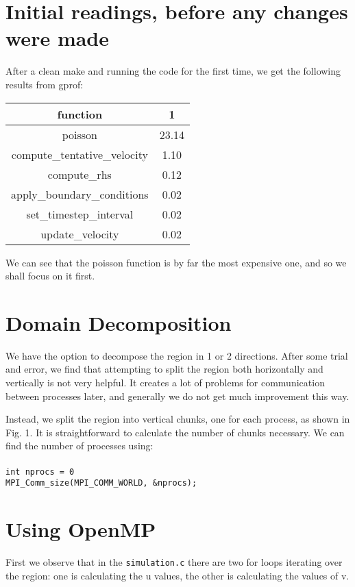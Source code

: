 \documentclass[11pt,journal]{article}
\newcommand\tab[1][1cm]{\hspace*{#1}}
\begin{document}
	\section{Initial readings, before any changes were made}
	After a clean make and running the code for the first time, we get the following results from gprof:
	\begin{table}[h]
		\centering
		\begin{tabular}{c|c}
			function & 1  \\
			\hline
			poisson & 23.14 \\
			compute\_tentative\_velocity & 1.10 \\
			compute\_rhs & 0.12 \\
			apply\_boundary\_conditions & 0.02 \\
			set\_timestep\_interval & 0.02 \\
			update\_velocity & 0.02\\
		\end{tabular}
	\end{table}

	We can see that the poisson function is by far the most expensive one, and so we shall focus on it first.
	
	\section{Domain Decomposition}
	
	We have the option to decompose the region in 1 or 2 directions. After some trial and error, we find that attempting to split the region both horizontally and vertically is not very helpful. It creates a lot of problems for communication between processes later, and generally we do not get much improvement this way.
	
	Instead, we split the region into vertical chunks, one for each process, as shown in Fig. 1. It is straightforward to calculate the number of chunks necessary. We can find the number of processes using:\\
	\tab\\
	\tab \texttt{int nprocs = 0}\\
	\tab \texttt{MPI\_Comm\_size(MPI\_COMM\_WORLD, \&nprocs);}
		


	\section{Using OpenMP}
	First we observe that in the \texttt{simulation.c} there are two for loops iterating over the region: one is calculating the u values, the other is calculating the values of v. 
	

\end{document}

